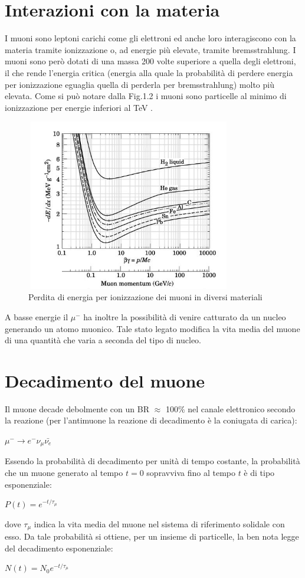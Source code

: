 \documentclass{standalone}
\begin{document}
\section{Interazioni con la materia}
I muoni sono leptoni carichi come gli elettroni ed anche loro interagiscono con la materia tramite ionizzazione o, ad energie pi\`u elevate, tramite bremsstrahlung.
I muoni sono per\`o dotati di una massa 200 volte superiore a quella degli elettroni, il che rende l'energia critica (energia alla quale la probabilit\`a di perdere energia per ionizzazione eguaglia quella di perderla per bremsstrahlung) molto pi\`u elevata.
Come si pu\`o notare dalla Fig.1.2 i muoni sono particelle al minimo di ionizzazione per energie inferiori al TeV \cite{Groom}.
\begin{figure}[H]
	\centering
	\includegraphics[width=9cm, height=7.5cm]{images/Energyloss.jpg}
	\caption{Perdita di energia per ionizzazione dei muoni in diversi materiali}
\end{figure}
A basse energie il ${\mu}^-$ ha inoltre la possibilit\`a di venire catturato da un nucleo generando un atomo muonico.
Tale stato legato modifica la vita media del muone di una quantit\`a che varia a seconda del tipo di nucleo.
\section{Decadimento del muone}
Il muone decade debolmente con un BR $\approx$ 100$\%$ nel canale elettronico secondo la reazione (per l'antimuone la reazione di decadimento \`e la coniugata di carica):\\
\centerline{$\mu^- \rightarrow e^- \nu_\mu \bar{\nu_e}$}
Essendo la probabilit\`a di decadimento per unit\`a di tempo costante, la probabilit\`a che un muone generato al tempo $t=0$ sopravviva fino al tempo $t$ \`e di tipo esponenziale:\\
\centerline{$P(t)=e^{-t/\tau_\mu}$}
dove $\tau_\mu$ indica la vita media del muone nel sistema di riferimento solidale con esso.
Da tale probabilit\`a si ottiene, per un insieme di particelle, la ben nota legge del decadimento esponenziale: \cite{Bendiscioli} \\
\centerline{$N(t)=N_0e^{-t/\tau_\mu}$}
\end{document}
